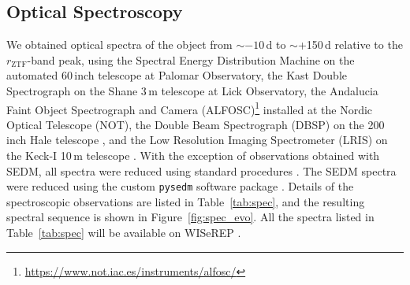 \documentclass[twocolumn]{aastex631}
\begin{document}
\subsection{Optical Spectroscopy}\label{sec:optical_spec}
We obtained optical spectra of the object from $\sim$$-10$\,d to $\sim$+150\,d relative to the $r_\mathrm{ZTF}$-band peak, using the Spectral Energy Distribution Machine \citep[SEDM;][]{SEDM_2018} on the automated 60\,inch telescope \citep[P60;][]{P60_2006} at Palomar Observatory, the Kast Double Spectrograph \citep{miller1994kast} on the Shane 3\,m telescope at Lick Observatory, the Andalucia Faint Object Spectrograph and Camera (ALFOSC)\footnote{\url{https://www.not.iac.es/instruments/alfosc/}} installed at the Nordic Optical Telescope (NOT), the Double Beam Spectrograph (DBSP) on the 200\,inch Hale telescope \citep[P200;][]{P200_1982}, and the Low Resolution Imaging Spectrometer (LRIS) on the Keck-I 10\,m telescope \citep{Keck_1995}. With the exception of observations obtained with SEDM, all spectra were reduced using standard procedures \citep[e.g.,][]{Matheson_2000}. The SEDM spectra were reduced using the custom \texttt{pysedm} software package \citep{Rigault_pysedm_2019}. Details of the spectroscopic observations are listed in Table~\ref{tab:spec}, and the resulting spectral sequence is shown in Figure~\ref{fig:spec_evo}. All the spectra listed in Table~\ref{tab:spec} will be available on WISeREP \citep{wiserep_2012}.
\end{document}
